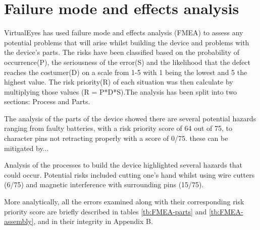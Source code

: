 \section{Failure mode and effects analysis}
VirtualEyes has used failure mode and effects analysis (FMEA) to assess any potential problems that will arise whilst building the device and problems with the device's parts. The risks have been classified based on the probability of occurrence(P), the seriousness of the error(S) and the likelihood that the defect reaches the costumer(D) on a scale from 1-5 with 1 being the lowest and 5 the highest value. The risk priority(R) of each situation was then calculate by multiplying those values (R = P*D*S).The analysis has been split into two sections: Process and Parts. 

The analysis of the parts of the device showed there are several potential hazards ranging from faulty batteries, with a risk priority score of 64 out of 75, to character pins not retracting properly with a score of 0/75. these can be mitigated by... 

Analysis of the processes to build the device highlighted several hazards that could occur. Potential risks included cutting one's hand whilst using wire cutters (6/75) and magnetic interference with surrounding pins (15/75).

More analytically, all the errors examined along with their corresponding risk priority score are briefly described in tables \ref{tb:FMEA-parts} and \ref{tb:FMEA-assembly}, and in their integrity in Appendix B.

